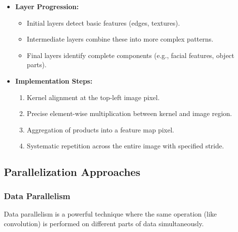 \documentclass[conference, 10pt]{IEEEtran}
\begin{document}
\begin{itemize}
    \item \textbf{Layer Progression:}
    \begin{itemize}
        \item Initial layers detect basic features (edges, textures).
        \item Intermediate layers combine these into more complex patterns.
        \item Final layers identify complete components (e.g., facial features, object parts).
    \end{itemize}
    \item \textbf{Implementation Steps:}
    \begin{enumerate}
        \item Kernel alignment at the top-left image pixel.
        \item Precise element-wise multiplication between kernel and image region.
        \item Aggregation of products into a feature map pixel.
        \item Systematic repetition across the entire image with specified stride.
    \end{enumerate}
\end{itemize}

\subsection{Parallelization Approaches}
\subsubsection{Data Parallelism}
Data parallelism is a powerful technique where the same operation (like convolution) is performed on different parts of data simultaneously.
\end{document}
